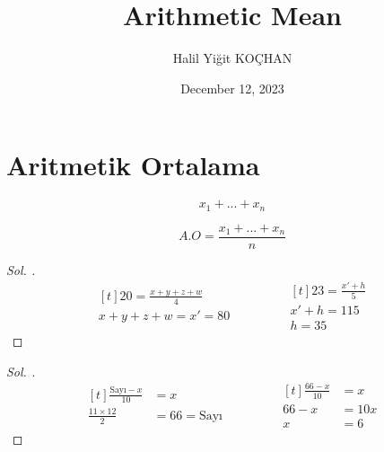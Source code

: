 \documentclass{article}
\title{Arithmetic Mean}
\author{Halil Yiğit KOÇHAN}
\date{December 12, 2023}
\theoremstyle{mytheoremstyle}
\theoremstyle{mytheoremstyle}
\theoremstyle{myproblemstyle}
\begin{document}
    \maketitle

\section{Aritmetik Ortalama}

$$ x_1 + ... + x_n $$

$$ A.O = \frac{x_1 + ... + x_n}{n} $$

\begin{problem}
\end{problem}

\begin{proof}[\textit{ Sol. }]
  \begin{equation*}
    \begin{aligned}[t]
      20 = \frac{x + y + z + w}{4}\\
      x + y + z + w = x' = 80
    \end{aligned}
    \qquad\qquad
    \begin{aligned}[t]
      23 = \frac{x' + h}{5}\\
      x' + h = 115\\
      h = 35
    \end{aligned}
  \end{equation*}
\end{proof}

\begin{problem}
\end{problem}

\begin{proof}[\textit{ Sol. }]
  \begin{equation*}
    \begin{aligned}[t]
      \frac{\text{Sayı} - x}{10} &= x\\
      \frac{11 \times 12}{2} &= 66 = \text{Sayı}
    \end{aligned}
    \qquad\qquad
    \begin{aligned}[t]
      \frac{66 - x}{10} &= x\\
      66 - x &= 10x\\
      x &= 6
    \end{aligned}
  \end{equation*}
\end{proof}
\end{document}
